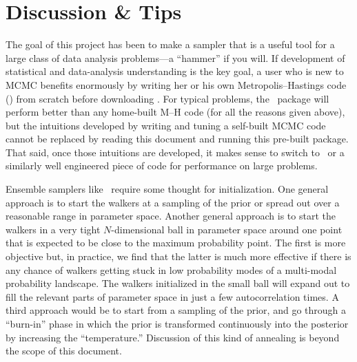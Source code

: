 \section{Discussion \& Tips}

The goal of this project has been to make a sampler that is a useful
tool for a large class of data analysis problems---a ``hammer'' if you
will.  If development of statistical and data-analysis understanding
is the key goal, a user who is new to MCMC benefits enormously by
writing her or his own Metropolis--Hastings code () from
scratch before downloading \this.  For typical problems, the
\this\ package will perform better than any home-built M--H code (for
all the reasons given above), but the intuitions developed by writing
and tuning a self-built MCMC code cannot be replaced by reading this
document and running this pre-built package.  That said, once those
intuitions are developed, it makes sense to switch to \this\ or a
similarly well engineered piece of code for performance on large
problems.

Ensemble samplers like \this\ require some thought for initialization.
One general approach is to start the walkers at a sampling of the
prior or spread out over a reasonable range in parameter space.
Another general approach is to start the walkers in a very tight
$N$-dimensional ball in parameter space around one point that is
expected to be close to the maximum probability point.  The first is
more objective but, in practice, we find that the latter is much more
effective if there is any chance of walkers getting stuck in low
probability modes of a multi-modal probability landscape.  The walkers
initialized in the small ball will expand out to fill the relevant
parts of parameter space in just a few autocorrelation times.  A third
approach would be to start from a sampling of the prior, and go
through a ``burn-in'' phase in which the prior is transformed
continuously into the posterior by increasing the ``temperature.''
Discussion of this kind of annealing is beyond the scope of this
document.

